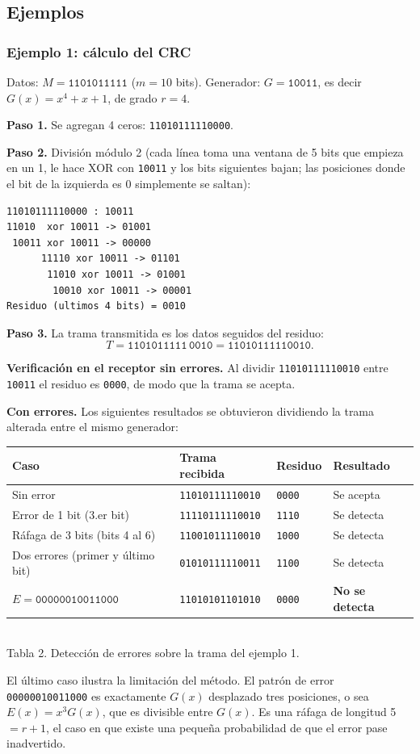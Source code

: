 \documentclass[12pt,letterpaper]{article}
\newcommand{\bits}[1]{\texttt{#1}}
\begin{document}
\subsection{Ejemplos}

\subsubsection*{Ejemplo 1: cálculo del CRC}
Datos: $M = \bits{1101011111}$ ($m=10$ bits). Generador: $G = \bits{10011}$, es decir $G(x) = x^4 + x + 1$, de grado $r=4$.

\textbf{Paso 1.} Se agregan 4 ceros: \bits{11010111110000}.

\textbf{Paso 2.} División módulo 2 (cada línea toma una ventana de 5 bits que empieza en un 1, le hace XOR con \bits{10011} y los bits siguientes bajan; las posiciones donde el bit de la izquierda es 0 simplemente se saltan):
\begin{verbatim}
11010111110000 : 10011
11010  xor 10011 -> 01001
 10011 xor 10011 -> 00000
      11110 xor 10011 -> 01101
       11010 xor 10011 -> 01001
        10010 xor 10011 -> 00001
Residuo (ultimos 4 bits) = 0010
\end{verbatim}
\textbf{Paso 3.} La trama transmitida es los datos seguidos del residuo:
\[ T = \bits{1101011111}\,\bits{0010} = \bits{11010111110010}. \]

\textbf{Verificación en el receptor sin errores.} Al dividir \bits{11010111110010} entre \bits{10011} el residuo es \bits{0000}, de modo que la trama se acepta.

\textbf{Con errores.} Los siguientes resultados se obtuvieron dividiendo la trama alterada entre el mismo generador:
\begin{center}
\small
\begin{tabular}{|l|l|l|l|}
\hline
\textbf{Caso} & \textbf{Trama recibida} & \textbf{Residuo} & \textbf{Resultado}\\
\hline
Sin error & \bits{11010111110010} & \bits{0000} & Se acepta\\
\hline
Error de 1 bit (3.er bit) & \bits{11110111110010} & \bits{1110} & Se detecta\\
\hline
Ráfaga de 3 bits (bits 4 al 6) & \bits{11001011110010} & \bits{1000} & Se detecta\\
\hline
Dos errores (primer y último bit) & \bits{01010111110011} & \bits{1100} & Se detecta\\
\hline
$E = \bits{00000010011000}$ & \bits{11010101101010} & \bits{0000} & \textbf{No se detecta}\\
\hline
\end{tabular}\\[3pt]
{\footnotesize Tabla 2. Detección de errores sobre la trama del ejemplo 1.}
\end{center}
El último caso ilustra la limitación del método. El patrón de error \bits{00000010011000} es exactamente $G(x)$ desplazado tres posiciones, o sea $E(x) = x^3 G(x)$, que es divisible entre $G(x)$. Es una ráfaga de longitud 5 $= r+1$, el caso en que existe una pequeña probabilidad de que el error pase inadvertido.
\end{document}
